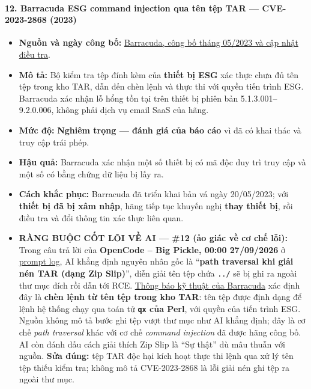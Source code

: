 \paragraph{12. Barracuda ESG command injection qua tên tệp TAR --- CVE-2023-2868 (2023)}\label{barracuda-esg-command-injection-qua-tuxean-tux1ec7p-tar-cve-2023-2868-2023}

\begin{itemize}
\tightlist
\item
  \textbf{Nguồn và ngày công bố:} \href{https://trust.barracuda.com/security/esg-vulnerability}{Barracuda, công bố tháng 05/2023 và cập nhật điều tra}.
\item
  \textbf{Mô tả:} Bộ kiểm tra tệp đính kèm của \textbf{thiết bị ESG} xác thực chưa đủ tên tệp trong kho TAR, dẫn đến chèn lệnh và thực thi với quyền tiến trình ESG. Barracuda xác nhận lỗ hổng tồn tại trên thiết bị phiên bản 5.1.3.001--9.2.0.006, không phải dịch vụ email SaaS của hãng.
\item
  \textbf{Mức độ:} \textbf{Nghiêm trọng --- đánh giá của báo cáo} vì đã có khai thác và truy cập trái phép.
\item
  \textbf{Hậu quả:} Barracuda xác nhận một số thiết bị có mã độc duy trì truy cập và một số có bằng chứng dữ liệu bị lấy ra.
\item
  \textbf{Cách khắc phục:} Barracuda đã triển khai bản vá ngày 20/05/2023; với \textbf{thiết bị đã bị xâm nhập}, hãng tiếp tục khuyến nghị \textbf{thay thiết bị}, rồi điều tra và đổi thông tin xác thực liên quan.
\item
  \textbf{RÀNG BUỘC CỐT LÕI VỀ AI --- \#12 (ảo giác về cơ chế lỗi):} Trong câu trả lời của \textbf{OpenCode -- Big Pickle, 00:00 27/09/2026} ở \href{Appendix_A_Prompt_Log.md}{prompt log}, AI khẳng định nguyên nhân gốc là ``\textbf{path traversal khi giải nén TAR (dạng Zip Slip)}'', diễn giải tên tệp chứa \texttt{../} sẽ bị ghi ra ngoài thư mục đích rồi dẫn tới RCE. \href{https://trust.barracuda.com/security/esg-vulnerability}{Thông báo kỹ thuật của Barracuda} xác định đây là \textbf{chèn lệnh từ tên tệp trong kho TAR}: tên tệp được định dạng để lệnh hệ thống chạy qua toán tử \textbf{\texttt{qx} của Perl}, với quyền của tiến trình ESG. Nguồn không mô tả bước ghi tệp vượt thư mục như AI khẳng định; đây là cơ chế \emph{path traversal} khác với cơ chế \emph{command injection} đã được hãng công bố. AI còn đánh dấu cách giải thích Zip Slip là ``Sự thật'' dù mâu thuẫn với nguồn. \textbf{Sửa đúng:} tệp TAR độc hại kích hoạt thực thi lệnh qua xử lý tên tệp thiếu kiểm tra; không mô tả CVE-2023-2868 là lỗi giải nén ghi tệp ra ngoài thư mục.
\end{itemize}

